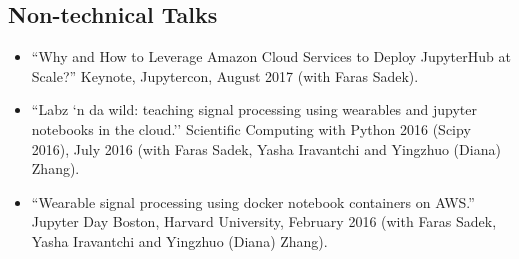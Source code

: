 \subsection*{Non-technical Talks}

\begin{itemize}
	\item ``Why and How to Leverage Amazon Cloud Services to Deploy JupyterHub at Scale?'' Keynote, Jupytercon, August 2017 (with Faras Sadek).
    \item ``Labz `n da wild: teaching signal processing using wearables and jupyter notebooks in the cloud.'' Scientific Computing with Python 2016 (Scipy 2016), July 2016 (with Faras Sadek, Yasha Iravantchi and Yingzhuo (Diana) Zhang).
    \item ``Wearable signal processing using docker notebook containers on AWS.'' Jupyter Day Boston, Harvard University, February 2016 (with Faras Sadek, Yasha Iravantchi and Yingzhuo (Diana) Zhang).
\end{itemize}


%
%
%
